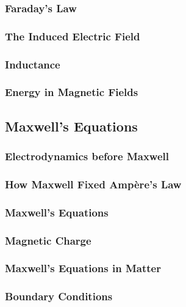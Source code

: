 \documentclass{article}
\begin{document}
\subsubsection{Faraday's Law}
\subsubsection{The Induced Electric Field}
\subsubsection{Inductance}
\subsubsection{Energy in Magnetic Fields}

\subsection{Maxwell's Equations}
\subsubsection{Electrodynamics before Maxwell}
\subsubsection{How Maxwell Fixed Amp\`ere's Law}
\subsubsection{Maxwell's Equations}
\subsubsection{Magnetic Charge}
\subsubsection{Maxwell's Equations in Matter}
\subsubsection{Boundary Conditions}

\newpage
\appendix
\end{document}
